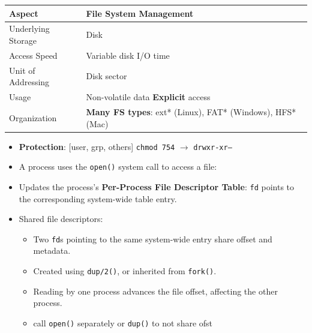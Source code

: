 \documentclass[8pt,twocolumn]{article}
\begin{document}
    \begin{table}[h!]
        \centering
        \renewcommand{\arraystretch}{0.6}
        \begin{tabular}{|l|p{6cm}|}
        \hline
        \textbf{Aspect} & \textbf{File System Management} \\
        \hline
        Underlying Storage & Disk \\
        \hline
        Access Speed & Variable disk I/O time \\
        \hline
        Unit of Addressing & Disk sector \\
        \hline
        Usage & Non-volatile data \newline \textbf{Explicit} access \\
        \hline
        Organization & \textbf{Many FS types}: ext* (Linux), FAT* (Windows), HFS* (Mac) \\
        \hline
        \end{tabular}
        \end{table}
        \vspace{-0.6em} %
\begin{itemize}
    \setlength{\itemsep}{0pt} %
    \setlength{\parskip}{0pt}
  \item \textbf{Protection}: [user, grp, others] \texttt{chmod 754} $\rightarrow$ \texttt{drwxr-xr--}
    \item A process uses the \texttt{open()} system call to access a file:
      \item Updates the process’s \textbf{Per-Process File Descriptor Table}: \texttt{fd} points to the corresponding system-wide table entry.
    \item Shared file descriptors:
\vspace{-0.6em}
    \begin{itemize}
        \setlength{\itemsep}{0pt} %
        \setlength{\parskip}{0pt}
      \item Two \texttt{fd}s pointing to the same system-wide entry share offset and metadata.
      \item Created using \texttt{dup/2()}, or inherited from \texttt{fork()}.
      \item Reading by one process advances the file offset, affecting the other process.
      \item call \texttt{open()} separately or \texttt{dup()} to not share ofst
    \end{itemize}
  \end{itemize}
\end{document}
